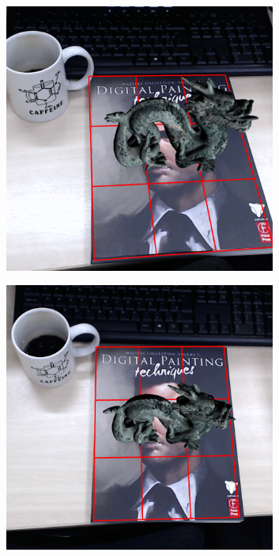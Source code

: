 \documentclass[annual]{acmsiggraph}
\begin{document}
\begin{figure}[t]
	\begin{subfigure}[c]{0.2\textwidth} \includegraphics[width=0.98\textwidth]{images/res_web1_cut3.png} \end{subfigure}%
	\begin{subfigure}[c]{0.2\textwidth} \includegraphics[width=0.98\textwidth]{images/res_web1_cut4.png} \end{subfigure}%

\end{figure}
\end{document}
